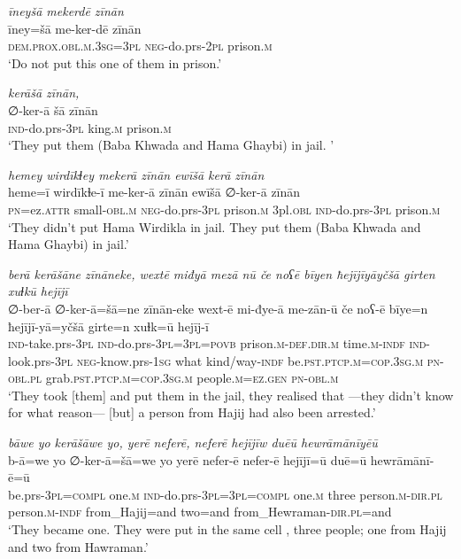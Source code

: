 \ea \label{BP.133}
\textit{īneyšā mekerdē zīnān} \\ 
\gll īney=šā me-ker-dē zīnān \\ 
 \textsc{dem.prox}\textsc{.obl}\textsc{.m}\textsc{.3sg}\textsc{=3pl} \textsc{neg-}do.prs-\textsc{2pl} prison\textsc{.m} \\ 
\glt `Do not put this one of them in prison.'
\z 
 
\ea \label{BP.137}
\textit{kerāšā zīnān,} \\ 
\gll ∅-ker-ā šā zīnān \\ 
 \textsc{ind-}do.prs\textsc{-3pl} king\textsc{.m} prison\textsc{.m} \\ 
\glt `They put them (Baba Khwada and Hama Ghaybi) in jail. '
\z 
 
\ea \label{BP.138}
\textit{hemey wirdīkɫey mekerā zīnān ewīšā kerā zīnān} \\ 
\gll heme=ī wirdīkɫe-ī me-ker-ā zīnān ewīšā ∅-ker-ā zīnān \\ 
 \textsc{pn}=ez.\textsc{attr} small\textsc{-obl}\textsc{.m} \textsc{neg-}do.prs\textsc{-3pl} prison\textsc{.m} 3pl\textsc{.obl} \textsc{ind-}do.prs\textsc{-3pl} prison\textsc{.m} \\ 
\glt `They didn’t put Hama Wirdikla in jail. They put them (Baba Khwada and Hama Ghaybi) in jail.'
\z 
 
\ea \label{BP.139}
\textit{berā kerāšāne zīnāneke, wextē miđyā mezā nū če noʕē bīyen ħejījīyāyčšā girten xuɫkū hejījī} \\ 
\gll ∅-ber-ā ∅-ker-ā=šā=ne zīnān-eke wext-ē mi-đye-ā me-zān-ū če noʕ-ē bīye=n ħejījī-yā=yčšā girte=n xuɫk=ū hejīj-ī \\ 
 \textsc{ind-}take.prs\textsc{-3pl} \textsc{ind-}do.prs\textsc{-3pl}\textsc{=3pl}\textsc{=\textsc{povb}} prison\textsc{.m}\textsc{-def}\textsc{.dir}\textsc{.m} time\textsc{.m}\textsc{-indf} \textsc{ind-}look.prs\textsc{-3pl} \textsc{neg-}know.prs\textsc{-\textsc{1sg}} what kind/way\textsc{-indf} be\textsc{.pst}\textsc{.ptcp}\textsc{.m}\textsc{=cop}\textsc{.3sg}\textsc{.m} \textsc{pn}\textsc{-obl}\textsc{.pl} grab\textsc{.pst}\textsc{.ptcp}\textsc{.m}\textsc{=cop}\textsc{.3sg}\textsc{.m} people\textsc{.m}\textsc{=ez.gen} \textsc{pn}\textsc{-obl}\textsc{.m} \\ 
\glt `They took [them] and put them in the jail, they realised that —they didn’t know for what reason— [but] a person from Hajij had also been arrested.'
\z 
 
\ea \label{BP.141}
\textit{bāwe yo kerāšāwe yo, yerē neferē, neferē hejījīw duēū hewrāmānīyēū} \\ 
\gll b-ā=we yo ∅-ker-ā=šā=we yo yerē nefer-ē nefer-ē hejījī=ū duē=ū hewrāmānī-ē=ū \\ 
 be.prs\textsc{-3pl}\textsc{=compl} one\textsc{.m} \textsc{ind-}do.prs\textsc{-3pl}\textsc{=3pl}\textsc{=compl} one\textsc{.m} three person\textsc{.m}\textsc{-dir}\textsc{.pl} person\textsc{.m}\textsc{-indf} from\_Hajij=and two=and from\_Hewraman\textsc{-dir}\textsc{.pl}=and \\ 
\glt `They became one. They were put in the same cell , three people; one from Hajij and two from Hawraman.'
\z 
 
